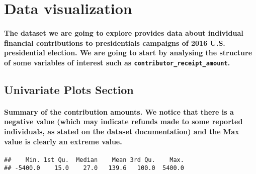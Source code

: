 \documentclass[]{article}
\let\oldparagraph\paragraph
\renewcommand{\paragraph}[1]{\oldparagraph{#1}\mbox{}}
\begin{document}
\section{Data visualization}\label{data-visualization}

\paragraph{\texorpdfstring{The dataset we are going to explore provides
data about individual financial contributions to presidentials campaigns
of 2016 U.S. presidential election. We are going to start by analysing
the structure of some variables of interest such as
\texttt{contributor\_receipt\_amount}.}{The dataset we are going to explore provides data about individual financial contributions to presidentials campaigns of 2016 U.S. presidential election. We are going to start by analysing the structure of some variables of interest such as contributor\_receipt\_amount.}}\label{the-dataset-we-are-going-to-explore-provides-data-about-individual-financial-contributions-to-presidentials-campaigns-of-2016-u.s.-presidential-election.-we-are-going-to-start-by-analysing-the-structure-of-some-variables-of-interest-such-as-contributor_receipt_amount.}

\subsection{Univariate Plots Section}\label{univariate-plots-section}

\paragraph{Summary of the contribution amounts. We notice that there is
a negative value (which may indicate refunds made to some reported
individuals, as stated on the dataset documentation) and the Max value
is clearly an extreme
value.}\label{summary-of-the-contribution-amounts.-we-notice-that-there-is-a-negative-value-which-may-indicate-refunds-made-to-some-reported-individuals-as-stated-on-the-dataset-documentation-and-the-max-value-is-clearly-an-extreme-value.}

\begin{verbatim}
##    Min. 1st Qu.  Median    Mean 3rd Qu.    Max. 
## -5400.0    15.0    27.0   139.6   100.0  5400.0
\end{verbatim}
\end{document}
